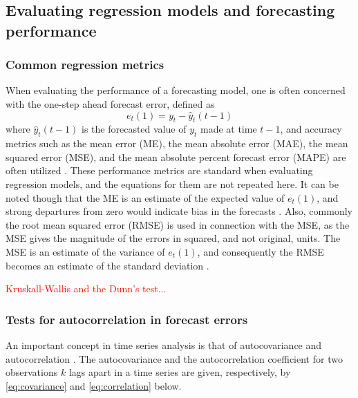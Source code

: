 

 
\subsection{Evaluating regression models and forecasting performance}
\label{sec:reg_metrics}
\subsubsection{Common regression metrics}
When evaluating the performance of a forecasting model, one is often concerned with the one-step ahead forecast error, defined as
$$e_t(1) = y_t - \hat{y}_t (t-1)$$ 
where $\hat{y}_t (t-1)$ is the forecasted value of $y_t$ made at time $t-1$, and accuracy metrics such as the mean error (ME), the mean absolute error (MAE), the mean squared error (MSE), and the mean absolute percent forecast error (MAPE) are often utilized \cite{Montgomery2015}. These performance metrics are standard when evaluating regression models, and the equations for them are not repeated here. It can be noted though that the ME is an estimate of the expected value of $e_t(1)$, and strong departures from zero would indicate bias in the forecasts \cite{Montgomery2015}. Also, commonly the root mean squared error (RMSE) is used in connection with the MSE, as the MSE gives the magnitude of the errors in squared, and not original, units. The MSE is an estimate of the variance of $e_t(1)$, and consequently the RMSE becomes an estimate of the standard deviation \cite{Montgomery2012}. 

\textcolor{red}{Kruskall-Wallis and the Dunn's test...}

\subsubsection{Tests for autocorrelation in forecast errors}
\label{sec:auto_errors}
An important concept in time series analysis is that of autocovariance and autocorrelation \cite{Montgomery2015}. The autocovariance and  the autocorrelation coefficient for two observations $k$ lags apart in a time series are given, respectively, by \cref{eq:covariance} and \cref{eq:correlation} below.  

